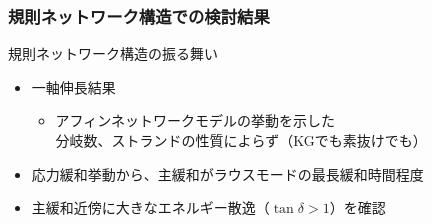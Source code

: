 \documentclass[11pt, dvipdfmx]{beamer}
\begin{document}
\begin{frame}
\frametitle{規則ネットワーク構造での検討結果}

\vspace{-2mm}
\small
\begin{alertblock}{規則ネットワーク構造の振る舞い}
\begin{itemize}
\item
一軸伸長結果
	\begin{itemize}
	\item
	\alert{アフィンネットワークモデルの挙動}を示した\\\alert{分岐数、ストランドの性質によらず}（KGでも素抜けでも）
	\end{itemize}
\item
応力緩和挙動から、主緩和が\alert{ラウスモードの最長緩和時間程度}
\item
主緩和近傍に\alert{大きなエネルギー散逸（$\tan \delta > 1$）}を確認
\end{itemize}
\end{alertblock}


\end{frame}
\end{document}
